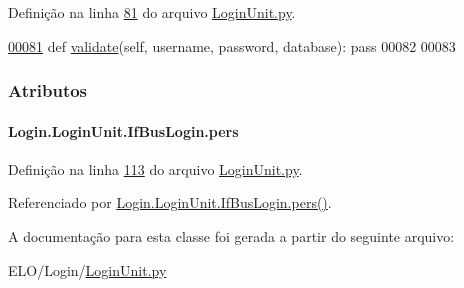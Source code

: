 Definição na linha \hyperlink{LoginUnit_8py_source_l00081}{81} do arquivo \hyperlink{LoginUnit_8py_source}{Login\+Unit.\+py}.


\begin{DoxyCode}
\hypertarget{classLogin_1_1LoginUnit_1_1IfBusLogin_l00081}{}\hyperlink{classLogin_1_1LoginUnit_1_1IfBusLogin_a6945b614a0b0f5ee03c61bcd3982c821}{00081}     \textcolor{keyword}{def }\hyperlink{classLogin_1_1LoginUnit_1_1IfBusLogin_a6945b614a0b0f5ee03c61bcd3982c821}{validate}(self, username, password, database): \textcolor{keyword}{pass}
00082 
00083 
\end{DoxyCode}


\subsubsection{Atributos}
\hypertarget{classLogin_1_1LoginUnit_1_1IfBusLogin_a53b8075436052b94282021c84a2c3211}{}
\paragraph[{pers}]{\setlength{\rightskip}{0pt plus 5cm}Login.\+Login\+Unit.\+If\+Bus\+Login.\+pers}\label{classLogin_1_1LoginUnit_1_1IfBusLogin_a53b8075436052b94282021c84a2c3211}


Definição na linha \hyperlink{LoginUnit_8py_source_l00113}{113} do arquivo \hyperlink{LoginUnit_8py_source}{Login\+Unit.\+py}.



Referenciado por \hyperlink{classLogin_1_1LoginUnit_1_1IfBusLogin_ac72dec0df502cc712d090ef55e2beb56}{Login.\+Login\+Unit.\+If\+Bus\+Login.\+pers()}.



A documentação para esta classe foi gerada a partir do seguinte arquivo\+:\begin{DoxyCompactItemize}
\item 
E\+L\+O/\+Login/\hyperlink{LoginUnit_8py}{Login\+Unit.\+py}\end{DoxyCompactItemize}
